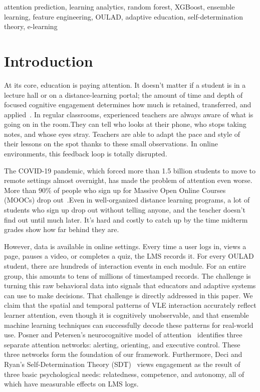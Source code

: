 \documentclass[conference]{IEEEtran}
\begin{document}
\begin{IEEEkeywords}
attention prediction, learning analytics, random forest, XGBoost, ensemble
learning, feature engineering, OULAD, adaptive education, self-determination
theory, e-learning
\end{IEEEkeywords}

\section{Introduction}
\label{sec:intro}

At its core, education is paying attention. It doesn't matter if a student is in a lecture hall or on a distance-learning portal; the amount of time and depth of focused cognitive engagement determines how much is retained, transferred, and applied~\cite{ref_attention_theory}. In regular classrooms, experienced teachers are always aware of what is going on in the room.They can tell who looks at their phone, who stops taking notes, and whose eyes stray. Teachers are able to adapt the pace and style of their lessons on the spot thanks to these small observations. In online environments, this feedback loop is totally disrupted.

The COVID-19 pandemic, which forced more than 1.5 billion students to move to remote settings almost overnight, has made the problem of attention even worse. More than 90\% of people who sign up for Massive Open Online Courses (MOOCs) drop out~\cite{ref_mooc_dropout}.Even in well-organized distance learning programs, a lot of students who sign up drop out without telling anyone, and the teacher doesn't find out until much later. It's hard and costly to catch up by the time midterm grades show how far behind they are.

However, data is available in online settings. Every time a user logs in, views a page, pauses a video, or completes a quiz, the LMS records it. For every OULAD student, there are hundreds of interaction events in each module. For an entire group, this amounts to tens of millions of timestamped records. The challenge is turning this raw behavioral data into signals that educators and adaptive systems can use to make decisions.
That challenge is directly addressed in this paper. We claim that the spatial and temporal patterns of VLE interaction accurately reflect learner attention, even though it is cognitively unobservable, and that ensemble machine learning techniques can successfully decode these patterns for real-world use. Posner and Petersen's neurocognitive model of attention~\cite{ref_attention_theory} identifies three separate attention networks: alerting, orienting, and executive control. These three networks form the foundation of our framework. Furthermore, Deci and Ryan's Self-Determination Theory (SDT)~\cite{ref_sdt} views engagement as the result of three basic psychological needs: relatedness, competence, and autonomy, all of which have measurable effects on LMS logs.
\end{document}
